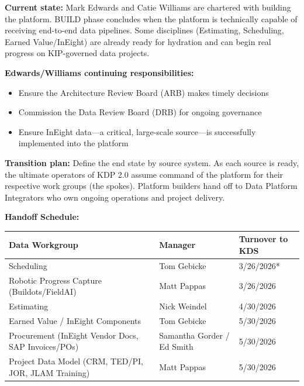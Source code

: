 \documentclass[12pt, a4paper]{article}
\begin{document}
\vspace{0.5em}
\noindent \textbf{Current state:} Mark Edwards and Catie Williams are chartered with building the platform. BUILD phase concludes when the platform is technically capable of receiving end-to-end data pipelines. Some disciplines (Estimating, Scheduling, Earned Value/InEight) are already ready for hydration and can begin real progress on KIP-governed data projects.

\noindent \textbf{Edwards/Williams continuing responsibilities:}
\begin{itemize}
    \item Ensure the Architecture Review Board (ARB) makes timely decisions
    \item Commission the Data Review Board (DRB) for ongoing governance
    \item Ensure InEight data—a critical, large-scale source—is successfully implemented into the platform
\end{itemize}


\vspace{0.5em}
\noindent \textbf{Transition plan:} Define the end state by source system. As each source is ready, the ultimate operators of KDP 2.0 assume command of the platform for their respective work groups (the spokes). Platform builders hand off to Data Platform Integrators who own ongoing operations and project delivery.

\vspace{0.5em}
\noindent \textbf{Handoff Schedule:}

\begin{tabular}{@{}p{5.5cm}p{4.5cm}p{3cm}@{}}
\toprule
\textbf{Data Workgroup} & \textbf{Manager} & \textbf{Turnover to KDS} \\
\midrule
Scheduling & Tom Gebicke & 3/26/2026* \\
Robotic Progress Capture (Buildots/FieldAI) & Matt Pappas & 3/26/2026 \\
Estimating & Nick Weindel & 4/30/2026 \\
Earned Value / InEight Components & Tom Gebicke & 5/30/2026 \\
Procurement (InEight Vendor Docs, SAP Invoices/POs) & Samantha Gorder / Ed Smith & 5/30/2026 \\
Project Data Model (CRM, TED/PI, JOR, JLAM Training) & Matt Pappas & 5/30/2026 \\
\bottomrule
\end{tabular}
\end{document}
